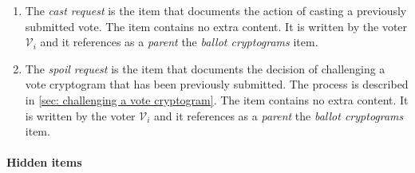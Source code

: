 \begin{enumerate}
    \item The \textit{cast request} is the item that documents the action of casting a previously submitted vote. The item contains no extra content. It is written by the voter $\mathcal{V}_i$ and it references as a \textit{parent} the \textit{ballot cryptograms} item.
    
    \item The \textit{spoil request} is the item that documents the decision of challenging a vote cryptogram that has been previously submitted. The process is described in \cref{sec: challenging a vote cryptogram}. The item contains no extra content. It is written by the voter $\mathcal{V}_i$ and it references as a \textit{parent} the \textit{ballot cryptograms} item.
\end{enumerate}

\paragraph{Hidden items}
